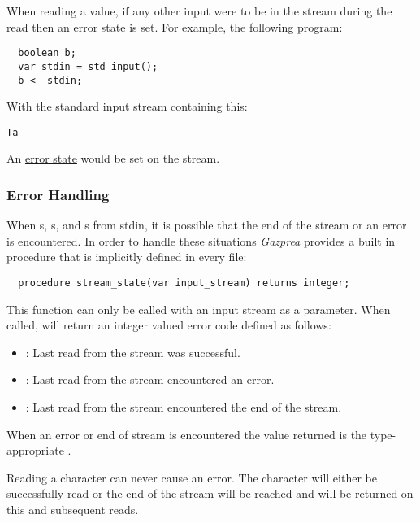 \documentclass[streams.tex]{subfiles}
\begin{document}
When reading a value, if any other input were to be in the stream during the read then an
\hyperref[sssec:stream_error]{error state} is set. For example, the following program:
\begin{lstlisting}
  boolean b;
  var stdin = std_input();
  b <- stdin;
\end{lstlisting}

With the standard input stream containing this:
\begin{lstlisting}
Ta
\end{lstlisting}

An \hyperref[sssec:stream_error]{error state} would be set on the stream.

\subsubsection{Error Handling}
\label{sssec:stream_error}
When s, s, and s from stdin, it is possible that the end of
the stream or an error is encountered. In order to handle these situations \textit{Gazprea} provides
a built in procedure that is implicitly defined in every file:
\begin{lstlisting}
  procedure stream_state(var input_stream) returns integer;
\end{lstlisting}

This function can only be called with an input stream as a parameter. When called,
 will return an integer valued error code defined as follows:
\begin{itemize}
  \item {}: Last read from the stream was successful.
  \item {}: Last read from the stream encountered an error.
  \item {}: Last read from the stream encountered the end of the stream.
\end{itemize}

When an error or end of stream is encountered the value returned is the type-appropriate
.

Reading a character can never cause an error. The character will either be successfully read or the
end of the stream will be reached and  will be returned on this and subsequent reads.
\end{document}
